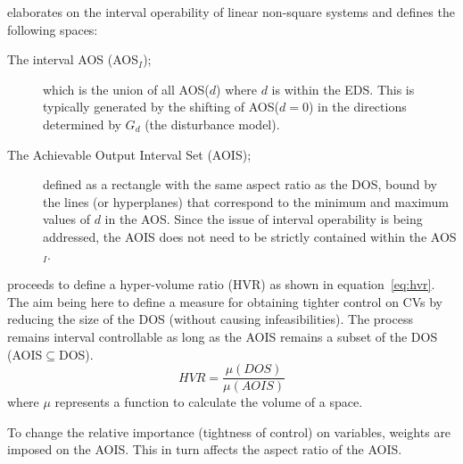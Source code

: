 \citet{limaphd} elaborates on the interval operability of linear non-square systems and defines the following spaces:
\begin{description}
  \item [The interval AOS (AOS$_I$);] which is the union of all AOS($d$) where $d$ is within the EDS. 
This is typically generated by the shifting of AOS($d=0$) in the directions determined by $G_d$ (the disturbance model).%
%
  \item [The Achievable Output Interval Set (AOIS);] defined as a rectangle with the same aspect ratio as the DOS, bound by the lines (or hyperplanes) that correspond to the minimum and maximum values of $d$ in the AOS. 
Since the issue of interval operability is being addressed, the AOIS does not need to be strictly contained within the AOS$_I$.%
%
\end{description}
\citet{limaphd} proceeds to define a hyper-volume ratio (HVR) as shown in equation~\ref{eq:hvr}. 
The aim being here to define a measure for obtaining tighter control on CVs by reducing the size of the DOS (without causing infeasibilities). 
The process remains interval controllable as long as the AOIS remains a subset of the DOS (AOIS$\subseteq$DOS).
\begin{equation}
  \label{eq:hvr}
    HVR = \frac{\mu(DOS)}{\mu(AOIS)}
\end{equation}
where $\mu$ represents a function to calculate the volume of a space.%
%
%
%

To change the relative importance (tightness of control) on variables, weights are imposed on the AOIS. 
This in turn affects the aspect ratio of the AOIS.

